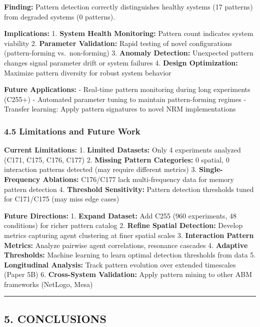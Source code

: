 \documentclass[
]{article}
\begin{document}
\textbf{Finding:} Pattern detection correctly distinguishes healthy
systems (17 patterns) from degraded systems (0 patterns).

\textbf{Implications:} 1. \textbf{System Health Monitoring:} Pattern
count indicates system viability 2. \textbf{Parameter Validation:} Rapid
testing of novel configurations (pattern-forming vs.~non-forming) 3.
\textbf{Anomaly Detection:} Unexpected pattern changes signal parameter
drift or system failures 4. \textbf{Design Optimization:} Maximize
pattern diversity for robust system behavior

\textbf{Future Applications:} - Real-time pattern monitoring during long
experiments (C255+) - Automated parameter tuning to maintain
pattern-forming regimes - Transfer learning: Apply pattern signatures to
novel NRM implementations

\subsubsection{4.5 Limitations and Future
Work}\label{limitations-and-future-work}

\textbf{Current Limitations:} 1. \textbf{Limited Datasets:} Only 4
experiments analyzed (C171, C175, C176, C177) 2. \textbf{Missing Pattern
Categories:} 0 spatial, 0 interaction patterns detected (may require
different metrics) 3. \textbf{Single-Frequency Ablations:} C176/C177
lack multi-frequency data for memory pattern detection 4.
\textbf{Threshold Sensitivity:} Pattern detection thresholds tuned for
C171/C175 (may miss edge cases)

\textbf{Future Directions:} 1. \textbf{Expand Dataset:} Add C255 (960
experiments, 48 conditions) for richer pattern catalog 2. \textbf{Refine
Spatial Detection:} Develop metrics capturing agent clustering at finer
spatial scales 3. \textbf{Interaction Pattern Metrics:} Analyze pairwise
agent correlations, resonance cascades 4. \textbf{Adaptive Thresholds:}
Machine learning to learn optimal detection thresholds from data 5.
\textbf{Longitudinal Analysis:} Track pattern evolution over extended
timescales (Paper 5B) 6. \textbf{Cross-System Validation:} Apply pattern
mining to other ABM frameworks (NetLogo, Mesa)

\begin{center}\rule{0.5\linewidth}{0.5pt}\end{center}

\subsection{5. CONCLUSIONS}\label{conclusions}
\end{document}
